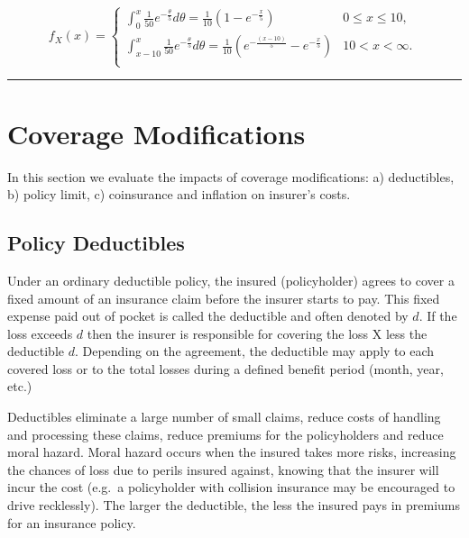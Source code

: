 \documentclass[]{book}
\theoremstyle{definition}
\theoremstyle{definition}
\theoremstyle{definition}
\theoremstyle{remark}
\begin{document}
\[f_{X}\left( x \right) = \left\{ \begin{matrix}
\int_{0}^{x}{\frac{1}{50}e^{- \frac{\theta}{5}}d\theta = \frac{1}{10}\left( 1 - e^{- \frac{x}{5}} \right)} & 0 \leq x \leq 10, \\
\int_{x - 10}^{x}{\frac{1}{50}e^{- \frac{\theta}{5}} d\theta} = \frac{1}{10}\left( e^{- \frac{\left( x - 10 \right)}{5}} - e^{- \frac{x}{5}} \right) & 10 < x < \infty. \\
\end{matrix} \right.\ \]

\begin{center}\rule{0.5\linewidth}{\linethickness}\end{center}

\section{Coverage Modifications}\label{S:CoverageModifications}

In this section we evaluate the impacts of coverage modifications: a)
deductibles, b) policy limit, c) coinsurance and inflation on insurer's
costs.

\subsection{Policy Deductibles}\label{S:PolicyDeduct}

Under an ordinary deductible policy, the insured (policyholder) agrees
to cover a fixed amount of an insurance claim before the insurer starts
to pay. This fixed expense paid out of pocket is called the deductible
and often denoted by \(d\). If the loss exceeds \(d\) then the insurer
is responsible for covering the loss X less the deductible \(d\).
Depending on the agreement, the deductible may apply to each covered
loss or to the total losses during a defined benefit period (month,
year, etc.)

Deductibles eliminate a large number of small claims, reduce costs of
handling and processing these claims, reduce premiums for the
policyholders and reduce moral hazard. Moral hazard occurs when the
insured takes more risks, increasing the chances of loss due to perils
insured against, knowing that the insurer will incur the cost (e.g.~a
policyholder with collision insurance may be encouraged to drive
recklessly). The larger the deductible, the less the insured pays in
premiums for an insurance policy.
\end{document}
